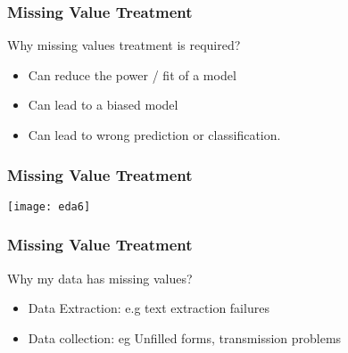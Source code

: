 \begin{frame}[fragile]\frametitle{Missing Value Treatment}
Why missing values treatment is required? 
\begin{itemize}
\item   Can reduce the power / fit of a model
\item Can lead to a biased model 
\item  Can lead to wrong prediction or classification.
\end{itemize}
\end{frame}

\begin{frame}[fragile]\frametitle{Missing Value Treatment}
\begin{center}
\texttt{[image: eda6]}
\end{center}
\end{frame}

\begin{frame}[fragile]\frametitle{Missing Value Treatment}
Why my data has missing values? 
\begin{itemize}
\item  Data Extraction: e.g text extraction failures
\item Data collection: eg Unfilled forms, transmission problems
\end{itemize}
\end{frame}



